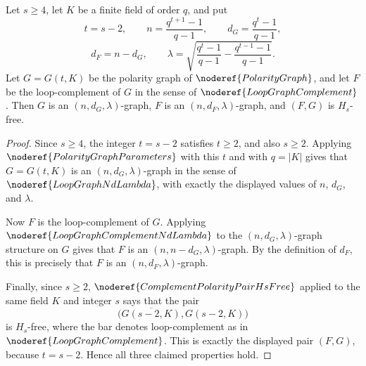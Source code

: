 \begin{helper}
Let \(s\ge4\), let \(K\) be a finite field of order \(q\), and put
\[
  t=s-2,\qquad
  n=\frac{q^{t+1}-1}{q-1},\qquad
  d_G=\frac{q^t-1}{q-1},
\]
\[
  d_F=n-d_G,\qquad
  \lambda=\sqrt{
    \frac{q^t-1}{q-1}-\frac{q^{t-1}-1}{q-1}}.
\]
Let \(G=G(t,K)\) be the polarity graph of \(\noderef{PolarityGraph}\), and let
\(F\) be the loop-complement of \(G\) in the sense of
\(\noderef{LoopGraphComplement}\).  Then \(G\) is an
\((n,d_G,\lambda)\)-graph, \(F\) is an \((n,d_F,\lambda)\)-graph, and
\((F,G)\) is \(H_s\)-free.
\end{helper}
\begin{proof}
Since \(s\ge4\), the integer \(t=s-2\) satisfies \(t\ge2\), and also
\(s\ge2\).  Applying \(\noderef{PolarityGraphParameters}\) with this \(t\)
and with \(q=|K|\) gives that \(G=G(t,K)\) is an
\((n,d_G,\lambda)\)-graph in the sense of \(\noderef{LoopGraphNdLambda}\),
with exactly the displayed values of \(n\), \(d_G\), and \(\lambda\).

Now \(F\) is the loop-complement of \(G\).  Applying
\(\noderef{LoopGraphComplementNdLambda}\) to the \((n,d_G,\lambda)\)-graph
structure on \(G\) gives that \(F\) is an \((n,n-d_G,\lambda)\)-graph.  By the
definition of \(d_F\), this is precisely that \(F\) is an
\((n,d_F,\lambda)\)-graph.

Finally, since \(s\ge2\), \(\noderef{ComplementPolarityPairHsFree}\) applied
to the same field \(K\) and integer \(s\) says that the pair
\[
  \bigl(\overline{G(s-2,K)},G(s-2,K)\bigr)
\]
is \(H_s\)-free, where the bar denotes loop-complement as in
\(\noderef{LoopGraphComplement}\).  This is exactly the displayed pair
\((F,G)\), because \(t=s-2\).  Hence all three claimed properties hold.
\end{proof}
